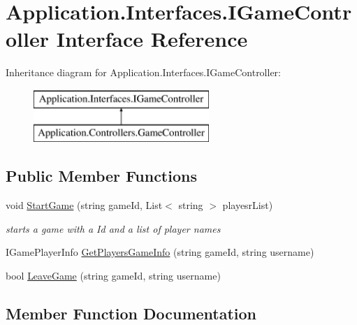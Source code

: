 \hypertarget{interface_application_1_1_interfaces_1_1_i_game_controller}{}\section{Application.\+Interfaces.\+I\+Game\+Controller Interface Reference}
\label{interface_application_1_1_interfaces_1_1_i_game_controller}
Inheritance diagram for Application.\+Interfaces.\+I\+Game\+Controller\+:\begin{figure}[H]
\begin{center}
\leavevmode
\includegraphics[height=2.000000cm]{interface_application_1_1_interfaces_1_1_i_game_controller}
\end{center}
\end{figure}
\subsection*{Public Member Functions}
\begin{DoxyCompactItemize}
\item 
void \mbox{\hyperlink{interface_application_1_1_interfaces_1_1_i_game_controller_ab3f492a78bbefc5de5dd3de5d1d26f79}{Start\+Game}} (string game\+Id, List$<$ string $>$ playesr\+List)
\begin{DoxyCompactList}\small\item\em starts a game with a Id and a list of player names \end{DoxyCompactList}\item 
I\+Game\+Player\+Info \mbox{\hyperlink{interface_application_1_1_interfaces_1_1_i_game_controller_a5a0a319e7bbc7c2d4786acf9f78994cb}{Get\+Players\+Game\+Info}} (string game\+Id, string username)
\item 
bool \mbox{\hyperlink{interface_application_1_1_interfaces_1_1_i_game_controller_ae81ea4aa4d3146c023277fbf17107623}{Leave\+Game}} (string game\+Id, string username)
\end{DoxyCompactItemize}


\subsection{Member Function Documentation}
\mbox{\label{interface_application_1_1_interfaces_1_1_i_game_controller_a5a0a319e7bbc7c2d4786acf9f78994cb}} 
